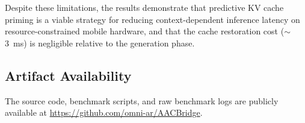 \documentclass[journal]{IEEEtran}
\begin{document}
Despite these limitations, the results demonstrate that predictive KV cache priming is a viable strategy for reducing context-dependent inference latency on resource-constrained mobile hardware, and that the cache restoration cost ($\sim$3~ms) is negligible relative to the generation phase.

\subsection{Artifact Availability}

The source code, benchmark scripts, and raw benchmark logs are publicly available at \url{https://github.com/omni-ar/AACBridge}.

\end{document}
